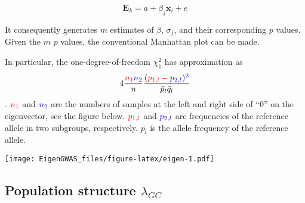 \documentclass[]{book}
\newenvironment{Shaded}{\begin{snugshade}}{\end{snugshade}}
\newcommand{\DataTypeTok}[1]{\textcolor[rgb]{0.13,0.29,0.53}{#1}}
\newcommand{\DecValTok}[1]{\textcolor[rgb]{0.00,0.00,0.81}{#1}}
\newcommand{\FloatTok}[1]{\textcolor[rgb]{0.00,0.00,0.81}{#1}}
\newcommand{\KeywordTok}[1]{\textcolor[rgb]{0.13,0.29,0.53}{\textbf{#1}}}
\newcommand{\NormalTok}[1]{#1}
\newcommand{\OperatorTok}[1]{\textcolor[rgb]{0.81,0.36,0.00}{\textbf{#1}}}
\newcommand{\StringTok}[1]{\textcolor[rgb]{0.31,0.60,0.02}{#1}}
\begin{document}
\[\mathbf{E}_k=a+\beta_j\mathbf{x}_i+e\]

It consequently generates \(m\) estimates of \(\beta\), \(\sigma_j\),
and their corresponding \(p\) values. Given the \(m\) \(p\) values, the
conventional Manhattan plot can be made.

In particular, the one-degree-of-freedom \(\chi^2_1\) has approximation
as
\[4\frac{\color{red}{n_1}\color{blue}{n_2}}{n}\frac{(\color{red}{p_{1,l}}-\color{blue}{p_{2,l}})^2}{\bar{p}_l\bar{q}_l}\].
\(\color{red}{n_1}\) and \(\color{blue}{n_2}\) are the numbers of
samples at the left and right side of ``0'' on the eigenvector, see the
figure below. \(\color{red}{p_{1,l}}\) and \(\color{blue}{p_{2,l}}\) are
frequencies of the reference allele in two subgroups, respectively.
\(\bar{p_l}\) is the allele frequency of the reference allele.

\begin{Shaded}
\end{Shaded}

\texttt{[image: EigenGWAS\_files/figure-latex/eigen-1.pdf]}

\hypertarget{population-structure-lambda_gc}{%
\subsection{\texorpdfstring{Population structure
\(\lambda_{GC}\)}{Population structure \textbackslash{}lambda\_\{GC\}}}\label{population-structure-lambda_gc}}
\end{document}
